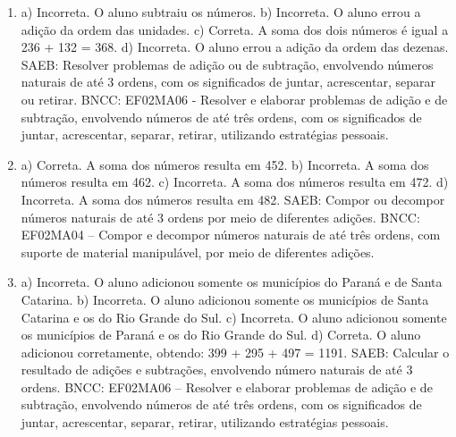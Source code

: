 
\begin{enumerate}
\item
a) Incorreta. O aluno subtraiu os números.
b) Incorreta. O aluno errou a adição da ordem das unidades.
c) Correta. A soma dos dois números é igual a 236 + 132 = 368.
d) Incorreta. O aluno errou a adição da ordem das dezenas.
SAEB: Resolver problemas de adição ou de subtração, envolvendo
números naturais de até 3 ordens, com os significados de juntar,
acrescentar, separar ou retirar.
BNCC: EF02MA06 - Resolver e elaborar problemas de adição e de subtração, envolvendo números de até três ordens, com os significados de juntar, acrescentar, separar,
retirar, utilizando estratégias pessoais.

\item
a) Correta. A soma dos números resulta em 452.
b) Incorreta. A soma dos números resulta em 462.
c) Incorreta. A soma dos números resulta em 472.
d) Incorreta. A soma dos números resulta em 482.
SAEB: Compor ou decompor números naturais de até 3 ordens por
meio de diferentes adições.
BNCC: EF02MA04 -- Compor e decompor números naturais de até três ordens,
com suporte de material manipulável, por meio de diferentes adições.

\item
a) Incorreta. O aluno adicionou somente os municípios do Paraná e de Santa Catarina.
b) Incorreta. O aluno adicionou somente os municípios de Santa Catarina e os do Rio Grande do Sul.
c) Incorreta. O aluno adicionou somente os municípios de Paraná e os do Rio Grande do Sul.
d) Correta. O aluno adicionou corretamente, obtendo: 399 + 295 + 497 = 1191.
SAEB: Calcular o resultado de adições e subtrações, envolvendo número naturais de até 3 ordens.
BNCC: EF02MA06 -- Resolver e elaborar problemas de adição e de subtração,
envolvendo números de até três ordens, com os significados de juntar, acrescentar, separar,
retirar, utilizando estratégias pessoais.
\end{enumerate}



